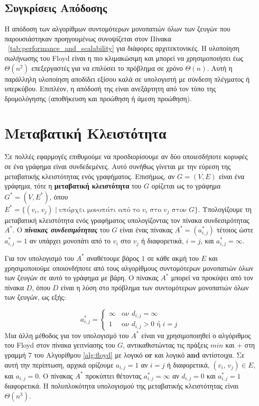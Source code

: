 \documentclass[12pt,a4paper]{article}
\begin{document}
\subsection{Συγκρίσεις Απόδοσης}

Η απόδοση των αλγορίθμων συντομότερων μονοπατιών όλων των ζευγών που παρουσιάστηκαν προηγουμένως συνοψίζεται στον Πίνακα ~\ref{tab:performance_and_scalability} για διάφορες αρχιτεκτονικές. Η υλοποίηση σωλήνωσης του \foreignlanguage{english}{Floyd} είναι η πιο κλιμακώσιμη και μπορεί να χρησιμοποιήσει έως $\Theta(n^2)$ επεξεργαστές για να επιλύσει το πρόβλημα σε χρόνο $\Theta(n)$. Αυτή η παράλληλη υλοποίηση αποδίδει εξίσου καλά σε υπολογιστή με σύνδεση πλέγματος ή υπερκύβου. Επιπλέον, η απόδοσή της είναι ανεξάρτητη από τον τύπο της δρομολόγησης (αποθήκευση και προώθηση ή άμεση προώθηση).
\vspace{0.3cm}
\section{Μεταβατική Κλειστότητα}

Σε πολλές εφαρμογές επιθυμούμε να προσδιορίσουμε αν δύο οποιεσδήποτε
κορυφές σε ένα γράφημα είναι συνδεδεμένες. Αυτό συνήθως γίνεται με την
εύρεση της μεταβατικής κλειστότητας ενός γραφήματος. Επισήμως, αν
$G = (V, E)$ είναι ένα γράφημα, τότε η \textbf{μεταβατική κλειστότητα}
του $G$ ορίζεται ως το γράφημα $G^* = (V, E^*)$, όπου
$E^* = \{(v_i,\, v_j) \mid \text{υπάρχει μονοπάτι από το } v_i
\text{ στο } v_j \text{ στον } G\}$.
Υπολογίζουμε τη μεταβατική κλειστότητα ενός γραφήματος υπολογίζοντας τον πίνακα συνδεσιμότητας $A^*$. Ο
\textbf{\textit{πίνακας συνδεσιμότητας}} του $G$ είναι ένας πίνακας
$A^* = (a^*_{i,j})$ τέτοιος ώστε $a^*_{i,j} = 1$ αν υπάρχει μονοπάτι
από το $v_i$ στο $v_j$ ή διαφορετικά, $i = j$, και $a^*_{i,j} = \infty$.

\indent Για τον υπολογισμό του $A^*$ αναθέτουμε βάρος $1$ σε κάθε
ακμή του $E$ και χρησιμοποιούμε οποιονδήποτε από τους αλγορίθμους
συντομότερων μονοπατιών όλων των ζευγών σε αυτό το γράφημα με βάρη.
Ο πίνακας $A^*$ μπορεί να προκύψει από τον πίνακα $D$, όπου $D$ είναι
η λύση στο πρόβλημα των συντομότερων μονοπατιών όλων των ζευγών,
ως εξής:

\[
a^*_{i,j} =
\begin{cases}
\infty & \text{αν } d_{i,j} = \infty \\
1      & \text{αν } d_{i,j} > 0 \text{ ή } i = j
\end{cases}
\]
Μια άλλη μέθοδος για τον υπολογισμό του $A^*$ είναι να χρησιμοποιηθεί
ο αλγόριθμος του \foreignlanguage{english}{Floyd} στον πίνακα γειτνίασης του $G$, αντικαθιστώντας
τις πράξεις $min$ και $+$ στη γραμμή 7 του Αλγορίθμου \ref{alg:floyd} με
λογικό \textbf{\foreignlanguage{english}{or}} και λογικό \textbf{\foreignlanguage{english}{and}} αντίστοιχα. Σε αυτή την
περίπτωση, αρχικά ορίζουμε $a_{i,j} = 1$ αν $i = j$ ή διαφορετικά,
$(v_i,\, v_j) \in E$, και $a_{i,j} = 0$. Ο πίνακας $A^*$
προκύπτει θέτοντας $a^*_{i,j} = \infty$ αν $d_{i,j} = 0$ και
$a^*_{i,j} = 1$ διαφορετικά. Η πολυπλοκότητα υπολογισμού της
μεταβατικής κλειστότητας είναι $\Theta(n^3)$.
\vspace{0.3cm}
\end{document}
